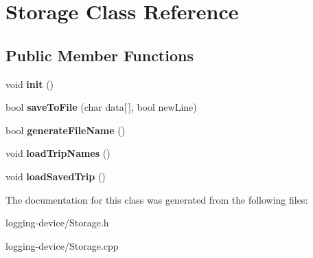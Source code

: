 \hypertarget{class_storage}{}\section{Storage Class Reference}
\label{class_storage}
\subsection*{Public Member Functions}
\begin{DoxyCompactItemize}
\item 
\mbox{\label{class_storage_a98b01eb20a64a4bf4127685147f7f6f1}} 
void {\bfseries init} ()
\item 
\mbox{\label{class_storage_a044a17325b2917afca49aa19ddb488f6}} 
bool {\bfseries save\+To\+File} (char data\mbox{[}$\,$\mbox{]}, bool new\+Line)
\item 
\mbox{\label{class_storage_a571ce9630665d9407ffbaeff55c47b0a}} 
bool {\bfseries generate\+File\+Name} ()
\item 
\mbox{\label{class_storage_a4831b2e8ecfa22da6971f5a8690cc4e3}} 
void {\bfseries load\+Trip\+Names} ()
\item 
\mbox{\label{class_storage_af56ca8289ed925300e3385114c561eec}} 
void {\bfseries load\+Saved\+Trip} ()
\end{DoxyCompactItemize}


The documentation for this class was generated from the following files\+:\begin{DoxyCompactItemize}
\item 
logging-\/device/Storage.\+h\item 
logging-\/device/Storage.\+cpp\end{DoxyCompactItemize}
